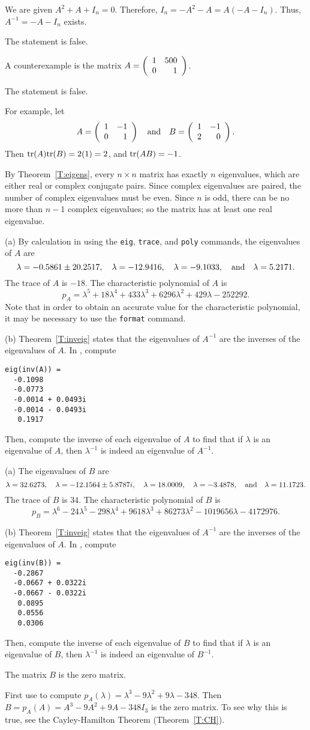 We are given $A^2 + A + I_n = 0$.  Therefore, $I_n = -A^2 - A =
A(-A - I_n)$.  Thus, $A^{-1} = -A - I_n$ exists.

\ans The statement is false. 

\soln  A counterexample is the matrix $A = \left(\begin{array}{rr} 1 & 500\\ 0 &1\end{array}\right)$.

 \ans The statement is false.

\soln For example, let
\[
A = \left(\begin{array}{rr} 1 & -1\\ 0 &1\end{array}\right) \quad\mbox{and}\quad B = \left(\begin{array}{rr} 1 & -1\\ 2 &0\end{array}\right).
\]
Then ${\rm tr}(A){\rm tr}(B) = 2(1) = 2$, and ${\rm tr}(AB) = -1$.

By Theorem~\ref{T:eigens}, every
$n \times n$ matrix has exactly $n$ eigenvalues, which are either
real or complex conjugate pairs.  Since complex eigenvalues are
paired, the number of complex eigenvalues must be even.  Since $n$ is
odd, there can be no more than $n - 1$ complex eigenvalues; so the
matrix has at least one real eigenvalue.

(a) By calculation in \Matlab using the {\tt eig}, {\tt trace}, and
{\tt poly} commands, the eigenvalues of $A$ are 
\[
\lambda = -0.5861 \pm 20.2517, \quad
\lambda = -12.9416, \quad
\lambda = -9.1033, \quad\mbox{and}\quad
\lambda = 5.2171.
\]
The trace of $A$ is $-18$.  The characteristic polynomial of $A$ is
\[
p_A = \lambda^5 + 18\lambda^4 + 433\lambda^3 + 6296\lambda^2 +
429\lambda - 252292.
\]
Note that in order to obtain an accurate value for the characteristic
polynomial, it may be necessary to use the {\tt format} command.

(b) Theorem~\ref{T:inveig} states that the eigenvalues of $A^{-1}$ are
the inverses of the eigenvalues of $A$.  In \Matlab, compute
\begin{verbatim}
eig(inv(A)) =
  -0.1098    
  -0.0773    
  -0.0014 + 0.0493i
  -0.0014 - 0.0493i
   0.1917
\end{verbatim}
Then, compute the inverse of each eigenvalue of $A$ to find that if
$\lambda$ is an eigenvalue of $A$, then $\lambda^{-1}$ is indeed an
eigenvalue of $A^{-1}$. 

(a) The eigenvalues of $B$ are
\[
\lambda = 32.6273, \quad
\lambda = -12.1564 \pm 5.8787i, \quad
\lambda = 18.0009, \quad
\lambda = -3.4878, \quad\mbox{and}\quad 
\lambda = 11.1723.
\]
The trace of $B$ is $34$.  The characteristic polynomial of $B$ is
\[
p_B = \lambda^6 - 24\lambda^5 - 298\lambda^4 + 9618\lambda^3
+ 86273\lambda^2 - 1019656\lambda - 4172976.
\]

(b) Theorem~\ref{T:inveig} states that the eigenvalues of $A^{-1}$ are
the inverses of the eigenvalues of $A$.  In \Matlab, compute
\begin{verbatim}
eig(inv(B)) =
  -0.2867
  -0.0667 + 0.0322i
  -0.0667 - 0.0322i
   0.0895
   0.0556
   0.0306
\end{verbatim}
Then, compute the inverse of each eigenvalue of $B$ to find that if
$\lambda$ is an eigenvalue of $B$, then $\lambda^{-1}$
is indeed an eigenvalue of $B^{-1}$.

\ans The matrix $B$ is the zero matrix.

\soln First use \Matlab to compute
$p_A(\lambda) = \lambda^3 - 9\lambda^2 + 9\lambda - 348$.  Then
$B = p_A(A) = A^3 - 9A^2 + 9A - 348I_3$ is the zero matrix.  To
see why this is true, see the Cayley-Hamilton Theorem
(Theorem~\ref{T:CH}).

